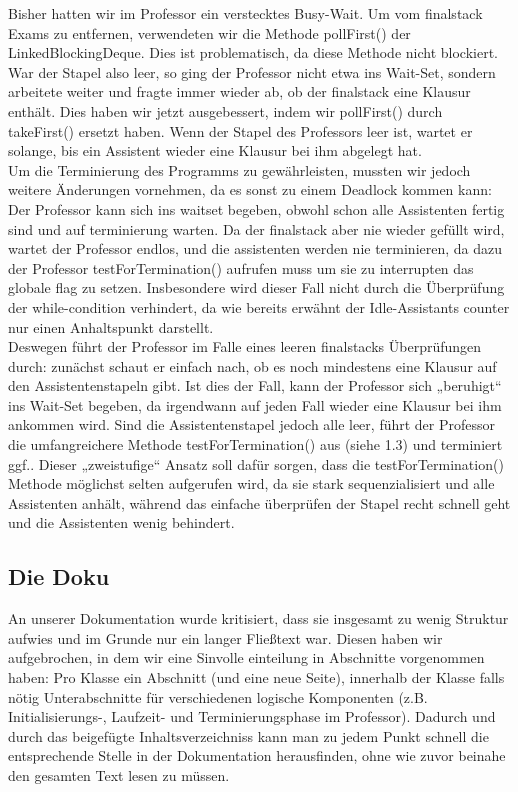 \documentclass[12pt,a4paper]{article}
\begin{document}
Bisher hatten wir im Professor ein verstecktes Busy-Wait. Um vom finalstack Exams zu entfernen, verwendeten wir die Methode pollFirst() der LinkedBlockingDeque. Dies ist problematisch, da diese Methode nicht blockiert. War der Stapel also leer, so ging der Professor nicht etwa ins Wait-Set, sondern arbeitete weiter und fragte immer wieder ab, ob der finalstack eine Klausur enthält. 
Dies haben wir jetzt ausgebessert, indem wir pollFirst() durch takeFirst() ersetzt haben. Wenn der Stapel des Professors leer ist, wartet er solange, bis ein Assistent wieder eine Klausur bei ihm abgelegt hat.\\
Um die Terminierung des Programms zu gewährleisten, mussten wir jedoch weitere Änderungen vornehmen, da es sonst zu einem Deadlock kommen kann: Der Professor kann sich ins waitset begeben, obwohl schon alle Assistenten fertig sind und auf terminierung warten. Da der finalstack aber nie wieder gefüllt wird, wartet der Professor endlos, und die assistenten werden nie terminieren, da dazu der Professor testForTermination() aufrufen muss um sie zu interrupten das globale flag zu setzen.  Insbesondere wird dieser Fall nicht durch die Überprüfung der while-condition verhindert, da wie bereits erwähnt der Idle-Assistants counter nur einen Anhaltspunkt darstellt.\\
Deswegen führt der Professor im Falle eines leeren finalstacks Überprüfungen durch: zunächst schaut er einfach nach, ob es noch mindestens eine Klausur auf den Assistentenstapeln gibt. Ist dies der Fall, kann der Professor sich „beruhigt“ ins Wait-Set begeben, da irgendwann auf jeden Fall wieder eine Klausur bei ihm ankommen wird. Sind die Assistentenstapel jedoch alle leer, führt der Professor die umfangreichere Methode testForTermination() aus (siehe 1.3) und terminiert ggf..
Dieser „zweistufige“ Ansatz soll dafür sorgen, dass die testForTermination() Methode möglichst selten aufgerufen wird, da sie stark sequenzialisiert und alle Assistenten anhält, während das einfache überprüfen der Stapel recht schnell geht und die Assistenten wenig behindert.

\subsection{Die Doku}
An unserer Dokumentation wurde kritisiert, dass sie insgesamt zu wenig Struktur aufwies und im Grunde nur ein langer Fließtext war. Diesen haben wir aufgebrochen, in dem wir eine Sinvolle einteilung in Abschnitte vorgenommen haben: Pro Klasse ein Abschnitt (und eine neue Seite), innerhalb der Klasse falls nötig Unterabschnitte für verschiedenen logische Komponenten (z.B. Initialisierungs-, Laufzeit- und Terminierungsphase im Professor). Dadurch und durch das beigefügte Inhaltsverzeichniss kann man zu jedem Punkt schnell die entsprechende Stelle in der Dokumentation herausfinden, ohne wie zuvor beinahe den gesamten Text lesen zu müssen.
\end{document}
